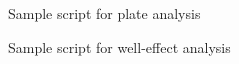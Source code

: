 \begin{figure}[ht]
  \centering
  \caption{Sample script for plate analysis}
\end{figure}

\begin{figure}[ht]
  \centering
  \caption{Sample script for well-effect analysis}
\end{figure}

